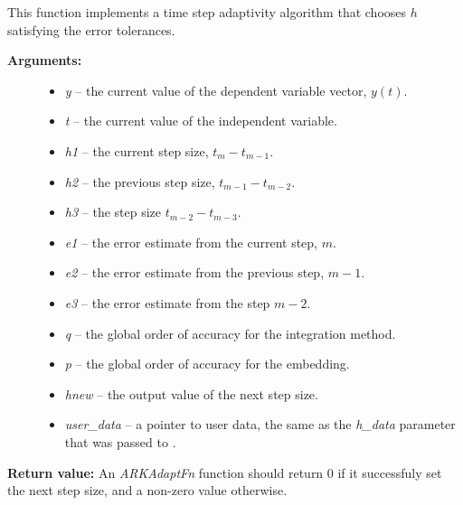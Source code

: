 \documentclass[letterpaper,10pt,english]{sphinxmanual}
\begin{document}
\begin{fulllineitems}
\label{c_interface/User_supplied:ARKAdaptFn}
This function implements a time step adaptivity algorithm
that chooses $h$ satisfying the error tolerances.
\begin{description}
\item[{\textbf{Arguments:}}] \leavevmode\begin{itemize}
\item {} 
\emph{y} -- the current value of the dependent variable vector, $y(t)$.

\item {} 
\emph{t} -- the current value of the independent variable.

\item {} 
\emph{h1} -- the current step size, $t_m - t_{m-1}$.

\item {} 
\emph{h2} -- the previous step size, $t_{m-1} - t_{m-2}$.

\item {} 
\emph{h3} -- the step size $t_{m-2}-t_{m-3}$.

\item {} 
\emph{e1} -- the error estimate from the current step, $m$.

\item {} 
\emph{e2} -- the error estimate from the previous step, $m-1$.

\item {} 
\emph{e3} -- the error estimate from the step $m-2$.

\item {} 
\emph{q} -- the global order of accuracy for the integration method.

\item {} 
\emph{p} -- the global order of accuracy for the embedding.

\item {} 
\emph{hnew} -- the output value of the next step size.

\item {} 
\emph{user\_data} -- a pointer to user data, the same as the
\emph{h\_data} parameter that was passed to {\hyperref[c_interface/User_callable:ARKodeSetAdaptivityFn]{}}.

\end{itemize}

\end{description}

\textbf{Return value:}
An \emph{ARKAdaptFn} function should return 0 if it
successfuly set the next step size, and a non-zero value otherwise.

\end{fulllineitems}
\end{document}
